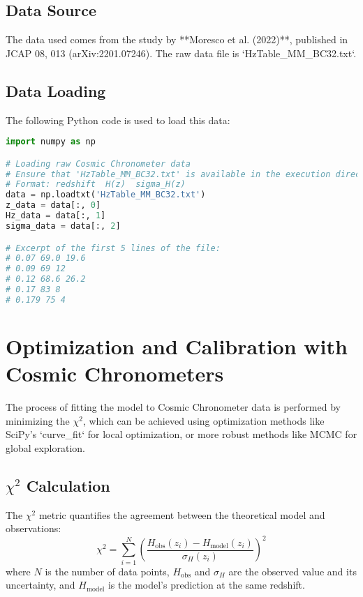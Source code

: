 \documentclass{article}
\begin{document}
\subsection{Data Source}
The data used comes from the study by **Moresco et al. (2022)**, published in JCAP 08, 013 (arXiv:2201.07246). The raw data file is `HzTable_MM_BC32.txt`.

\subsection{Data Loading}
The following Python code is used to load this data:
\begin{lstlisting}[language=Python, caption=Loading H(z) data]
import numpy as np

# Loading raw Cosmic Chronometer data
# Ensure that 'HzTable_MM_BC32.txt' is available in the execution directory.
# Format: redshift  H(z)  sigma_H(z)
data = np.loadtxt('HzTable_MM_BC32.txt')
z_data = data[:, 0]
Hz_data = data[:, 1]
sigma_data = data[:, 2]

# Excerpt of the first 5 lines of the file:
# 0.07 69.0 19.6
# 0.09 69 12
# 0.12 68.6 26.2
# 0.17 83 8
# 0.179 75 4
\end{lstlisting}

\section{Optimization and Calibration with Cosmic Chronometers}
The process of fitting the model to Cosmic Chronometer data is performed by minimizing the $\chi^2$, which can be achieved using optimization methods like SciPy's `curve_fit` for local optimization, or more robust methods like MCMC for global exploration.

\subsection{$\chi^2$ Calculation}
The $\chi^2$ metric quantifies the agreement between the theoretical model and observations:
$$\chi^2 = \sum_{i=1}^{N} \left( \frac{H_{\text{obs}}(z_i) - H_{\text{model}}(z_i)}{\sigma_{H}(z_i)} \right)^2$$
where $N$ is the number of data points, $H_{\text{obs}}$ and $\sigma_H$ are the observed value and its uncertainty, and $H_{\text{model}}$ is the model's prediction at the same redshift.
\end{document}

